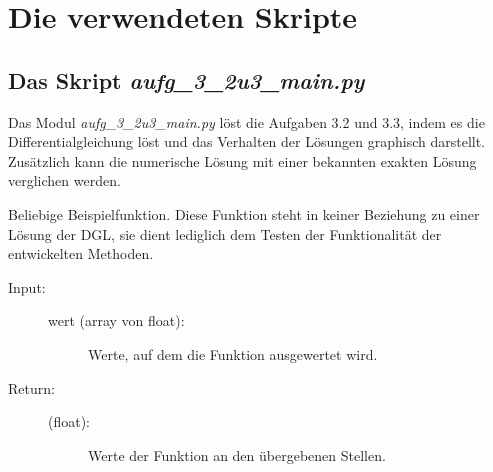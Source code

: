 \documentclass[letterpaper,10pt,ngerman, oneside, openright]{sphinxmanual}
\begin{document}
\chapter{Die verwendeten Skripte}

\section{Das Skript \textit{aufg\_3\_2u3\_main.py}}

\label{\detokenize{index:module-aufg_3_2u3_main}}
Das Modul \textit{aufg\_3\_2u3\_main.py} löst die Aufgaben 3.2 und 3.3, indem es die Differentialgleichung löst und
das Verhalten der Lösungen graphisch darstellt. Zusätzlich kann die numerische Lösung mit einer bekannten exakten Lösung verglichen werden.

\begin{fulllineitems}
\label{\detokenize{index:aufg_3_2u3_main.fntn}}
Beliebige Beispielfunktion. Diese Funktion steht in keiner Beziehung zu einer Lösung der DGL, sie dient lediglich dem Testen der Funktionalität der entwickelten Methoden.
\begin{description}
\item [{Input:}] \leavevmode

\begin{description}
\item[{wert (array von float):}] \leavevmode
Werte, auf dem die Funktion ausgewertet wird.
\end{description}

\end{description}
\begin{description}
\item[{Return:}] \leavevmode\begin{description}
\item[{(float):}] \leavevmode
Werte der Funktion an den übergebenen Stellen.

\end{description}

\end{description}

\end{fulllineitems}

\end{document}
